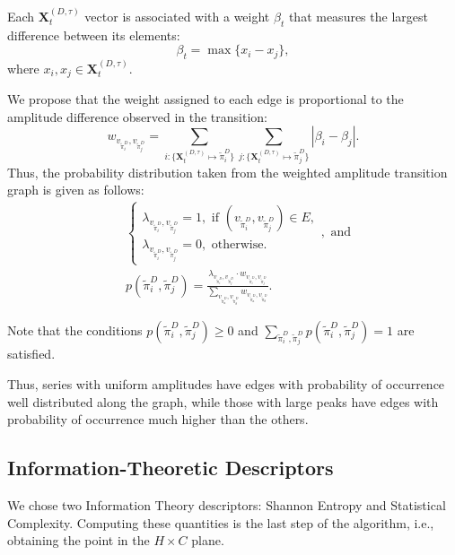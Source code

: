 \documentclass[journal]{IEEEtran}
\begin{document}
Each $\mathbf{X}^{(D, \tau)}_t$ vector is associated with a weight $\beta_t$ that measures the largest difference between its elements:
\begin{equation}
\beta_t = \max\{x_i - x_j\},
\end{equation}
where $x_i, x_j \in \mathbf{X}^{(D, \tau)}_t$.

We propose that the weight assigned to each edge is proportional to the amplitude difference observed in the transition:	
\begin{equation}
w_{v_{\widetilde \pi^D_i}, v_{\widetilde \pi^D_j}} =  \sum_{i : \{\mathbf{X}^{(D,\tau)}_t \mapsto \widetilde\pi^D_i\}} \sum_{j : \{\mathbf{X}^{(D,\tau)}_t \mapsto \widetilde\pi^D_j\}} |\beta_i - \beta_j| .
\end{equation}
Thus, the probability distribution taken from the weighted amplitude transition graph is given as follows:	
\begin{align}
&\left\{\begin{array}{l}
\lambda_{v_{\widetilde\pi^D_i}, v_{\widetilde\pi^D_j}} = 1, \text{ if } (v_{\widetilde\pi^D_i}, v_{\widetilde\pi^D_j}) \in {E}, \\
\lambda_{v_{\widetilde\pi^D_i}, v_{\widetilde\pi^D_j}} = 0, \text{ otherwise}.
\end{array}\right., \text{ and} \\
&p(\widetilde\pi^D_i, \widetilde\pi^D_j) = \frac{\lambda_{v_{\widetilde\pi^D_i}, v_{\widetilde\pi^D_j}} \cdot w_{v_{\widetilde\pi^D_i}, v_{\widetilde\pi^D_j}}}{\sum_{v_{\widetilde\pi^D_a}, v_{\widetilde\pi^D_b}} w_{v_{\widetilde\pi^D_a}, v_{\widetilde\pi^D_b}}}.
\end{align}

Note that the conditions $p(\widetilde\pi^D_i, \widetilde\pi^D_j) \ge 0$ and $\sum_{\widetilde\pi^D_i, \widetilde\pi^D_j} p(\widetilde\pi^D_i, \widetilde\pi^D_j) = 1$ are satisfied.

Thus, series with uniform amplitudes have edges with probability of occurrence well distributed along the graph, while those with large peaks have edges with probability of occurrence much higher than the others.

\subsection{Information-Theoretic Descriptors}\label{HC}

We chose two Information Theory descriptors: Shannon Entropy and Statistical Complexity.
Computing these quantities is the last step of the algorithm, i.e., obtaining the point in the $H \times C$ plane.
\end{document}

